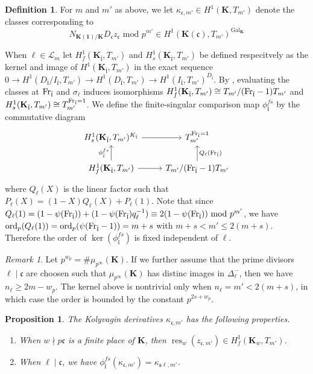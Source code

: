 \documentclass[leqno]{amsart}
\newcommand{\flw}{\bar{\fl}}
\newcommand{\Fr}{\textnormal{Fr}} %
\DeclareMathOperator{\Gal}{Gal}
\newcommand{\ord}{\textnormal{ord}}
\newcommand{\id}{\mathbf{1}}
\newcommand{\K}{{\mathbf{K}}} %
\newcommand{\rk}[1]{\K({#1})} %
\newcommand{\fc}{\mathfrak{c}}
\newcommand{\fs}{\mathfrak{s}}
\newcommand{\fl}{\mathfrak{l}}
\DeclareMathOperator{\res}{res}
\newtheorem{prop}[thm]{Proposition}
\theoremstyle{definition}
\newtheorem{defn}[thm]{Definition}
\theoremstyle{remark}
\newtheorem{rem}[thm]{Remark}
\begin{document}
\begin{defn}
For $m$ and  $m'$ as above, 
we let $\kappa_{\fc,m'}\in H^1(\K,T_{m'})$
denote the classes corresponding to 
\[
	N_{\rk{\id}/\K}D_{\fc}z_{\fc}
	\text{ mod }p^{m'} \in 
	H^1(\rk{\fc}, T_{m'})^{\Gal_\K}
\]
\end{defn}
When $\ell\in \mathcal{L}_m$
let $H^1_f(\K_{\flw},T_{m'})$ and
$H^1_s(\K_{\flw},T_{m'})$ be defined respecitvely
as the kernel and image of $H^1(\K_{\flw},T_{m'})$ 
in the exact sequence 
$0\to H^1(D_{\flw}/I_{\flw},T_{m'})
\to H^1(D_{\flw},T_{m'})
\to H^1(I_{\flw},T_{m'})^{D_{\flw}}$.
By \cite[Lem 1.4.7]{Rubin},
evaluating the classes at
$\Fr_{\flw}$ and $\sigma_\ell$ induces isomorphisms
$H^1_f(\K_{\flw},T_{m'})\cong T_{m'}/(\Fr_{\flw}-1)T_{m'}$
and
$H^1_s(\K_{\flw},T_{m'})\cong T_{m'}^{\Fr_{\flw}=1}$.
We define the finite-singular comparison map
$\phi_{\flw}^{fs}$ by the commutative diagram
\[
	\begin{tikzcd}
		H^1_s(\K_{\flw}, T_{m'})^{K_{\flw}} \arrow[r]&
		T_{m'}^{\Fr_{\flw}=1}\\
		H^1_{f}(\K_{\flw}, T_{m'}) \arrow[r]
		\arrow[u,"\phi_{\flw}^{fs}"]&
		T_{m'}/(\Fr_{\flw}-1)T_{m'}
		\arrow[u,"Q_\ell(\Fr_{\flw})",swap]
	\end{tikzcd}
\]
where $Q_\ell(X)$ is the linear factor  such that 
$P_\ell(X)=(1-X)Q_\ell(X)+P_\ell(1)$.
Note that since
$Q_\ell(1)=
(1-\psi(\Fr_{\flw}))+(1-\psi(\Fr_{\flw})q_\ell^{-1})
\equiv 2(1-\psi(\Fr_{\flw})) \text{ mod }p^{m'}$,
we have $\ord_p(Q_\ell(1))=\ord_p(\psi(\Fr_{\flw}-1))
=m+s$ with 
$m+s< m'\leq 2(m+s)$.
Therefore
the order of $\ker(\phi_{\flw}^{fs})$
is fixed independent of $\ell$.
\begin{rem}
Let $p^{w_p}=\#\mu_{p^\infty}(\K)$.
If we further assume that the prime divisors
$\ell\mid\fc$ are choosen such that
$\mu_{p^\infty}(\K)$ has distinc images in $\Delta_\ell^-$,
then we have  $n_\ell\geq 2m-w_p$.
The kernel above is nontrivial only when 
$n_\ell=m'<2(m+s)$, in which case the order 
is bounded by the constant $p^{2s+w_p}$.
\end{rem}


\begin{prop}
The Kolyvagin derivatives
$\kappa_{\fc,m'}$ has the following properties.
\begin{enumerate}[label=(\alph*)]
\item When $w\nmid p\fc$ is a finite place of  $\K$,
then  $\res_w(z_{\fc,m'})\in H^1_f(\K_w,T_{m'})$.
\item When $\ell\mid\fc$, we have
$\phi_{\flw}^{fs}(\kappa_{\fc,m'})=\kappa_{\fs\ell,m'}$.
\end{enumerate}
\end{prop}
\end{document}
